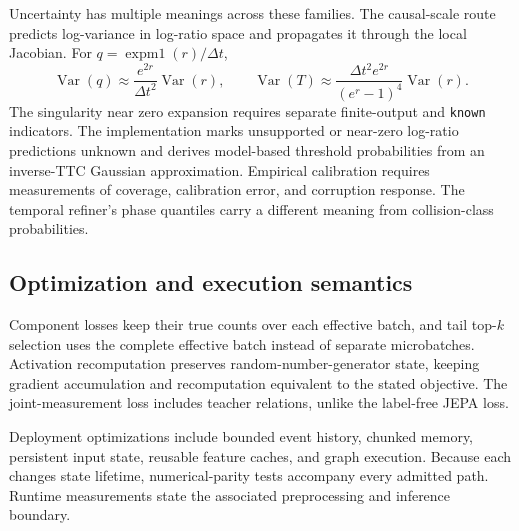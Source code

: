 Uncertainty has multiple meanings across these families. The causal-scale route predicts log-variance in log-ratio space and propagates it through the local Jacobian. For $q=\operatorname{expm1}(r)/\Delta t$,
\begin{equation}
 \operatorname{Var}(q)\approx \frac{e^{2r}}{\Delta t^2}\operatorname{Var}(r),\qquad
 \operatorname{Var}(T)\approx \frac{\Delta t^2e^{2r}}{(e^r-1)^4}\operatorname{Var}(r).
\end{equation}
The singularity near zero expansion requires separate finite-output and \texttt{known} indicators. The implementation marks unsupported or near-zero log-ratio predictions unknown and derives model-based threshold probabilities from an inverse-TTC Gaussian approximation. Empirical calibration requires measurements of coverage, calibration error, and corruption response. The temporal refiner's phase quantiles carry a different meaning from collision-class probabilities. 

\subsection{Optimization and execution semantics}
Component losses keep their true counts over each effective batch, and tail top-$k$ selection uses the complete effective batch instead of separate microbatches. Activation recomputation preserves random-number-generator state, keeping gradient accumulation and recomputation equivalent to the stated objective. The joint-measurement loss includes teacher relations, unlike the label-free JEPA loss. 

Deployment optimizations include bounded event history, chunked memory, persistent input state, reusable feature caches, and graph execution. Because each changes state lifetime, numerical-parity tests accompany every admitted path. Runtime measurements state the associated preprocessing and inference boundary.

